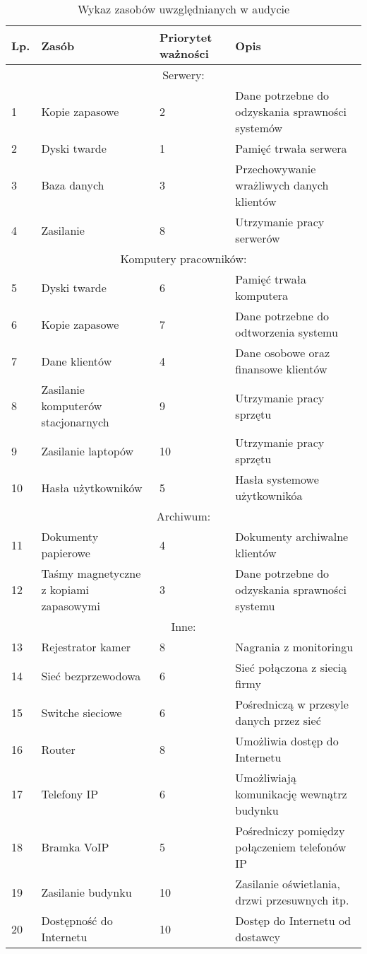 \begin{longtable}[!ht]{|p{0.5cm}|m{4cm}|m{2cm}|m{6cm}|}
	\caption{Wykaz zasobów uwzględnianych w audycie}
	\label{tab:spis_zasobow}\\
	\hline	
	\rowcolor{lightgray}\textbf{Lp.} & \textbf{Zasób} & \textbf{Priorytet ważności} & \textbf{Opis} \\ \hline
	\multicolumn{4}{|c|}{Serwery:} \\ \hline
	1 & Kopie zapasowe & 2 & Dane potrzebne do odzyskania \linebreak sprawności systemów \\ \hline
	2 & Dyski twarde & 1 & Pamięć trwała serwera \\ \hline
	3 & Baza danych & 3 & Przechowywanie wrażliwych danych klientów \\ \hline
	4 & Zasilanie & 8 & Utrzymanie pracy serwerów \\ \hline
	\multicolumn{4}{|c|}{Komputery pracowników:} \\ \hline	
	5 & Dyski twarde & 6 & Pamięć trwała komputera \\ \hline
	6 & Kopie zapasowe & 7 & Dane potrzebne do odtworzenia \linebreak systemu \\ \hline
	7 & Dane klientów & 4 & Dane osobowe oraz finansowe klientów \\ \hline
	8 & Zasilanie komputerów stacjonarnych & 9 & Utrzymanie pracy sprzętu \\ \hline
	9 & Zasilanie laptopów & 10 &  Utrzymanie pracy sprzętu \\ \hline
	10 &Hasła użytkowników & 5 & Hasła systemowe użytkownikóa \\ \hline
	\multicolumn{4}{|c|}{Archiwum:} \\ \hline
	11 & Dokumenty papierowe & 4 & Dokumenty archiwalne klientów \\	\hline
	12 & Taśmy magnetyczne z kopiami zapasowymi & 3 & Dane potrzebne do odzyskania \linebreak  sprawności systemu \\ \hline
	\multicolumn{4}{|c|}{Inne:} \\ \hline
	13 & Rejestrator kamer & 8 & Nagrania z monitoringu \\ \hline
	14 & Sieć bezprzewodowa & 6 & Sieć połączona z siecią firmy \\ \hline
	15 & Switche sieciowe & 6 & Pośredniczą w przesyle danych przez sieć \\ \hline
	16 & Router & 8 & Umożliwia dostęp do Internetu \\ \hline
	17 & Telefony IP & 6 & Umożliwiają komunikację wewnątrz budynku \\ \hline
	18 & Bramka VoIP & 5 & Pośredniczy pomiędzy połączeniem telefonów IP \\ \hline
	19 & Zasilanie budynku & 10 & Zasilanie oświetlania, drzwi przesuwnych itp. \\ \hline
	20 & Dostępność do Internetu & 10 & Dostęp do Internetu od dostawcy \\ \hline 
\end{longtable}


